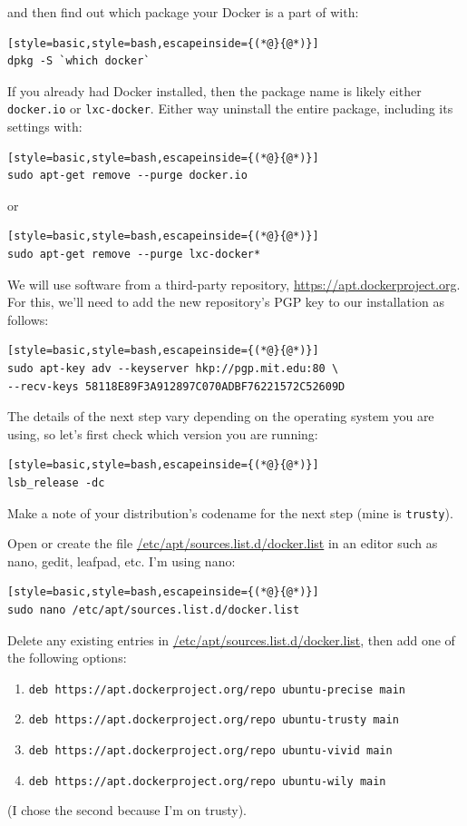 \documentclass[12pt, a4paper, twoside, openany, titlepage]{book}
\begin{document}
and then find out which package your Docker is a part of with:
\begin{lstlisting}[style=basic,style=bash,escapeinside={(*@}{@*)}]
dpkg -S `which docker`
\end{lstlisting}

If you already had Docker installed, then the package name is likely either \texttt{docker.io} or \texttt{lxc-docker}. Either way uninstall the entire package, including its settings with:
\begin{lstlisting}[style=basic,style=bash,escapeinside={(*@}{@*)}]
sudo apt-get remove --purge docker.io
\end{lstlisting}
or
\begin{lstlisting}[style=basic,style=bash,escapeinside={(*@}{@*)}]
sudo apt-get remove --purge lxc-docker*
\end{lstlisting}

We will use software from a third-party repository, \url{https://apt.dockerproject.org}. For this, we'll need to add the new repository's PGP key to our installation as follows:
\begin{lstlisting}[style=basic,style=bash,escapeinside={(*@}{@*)}]
sudo apt-key adv --keyserver hkp://pgp.mit.edu:80 \
--recv-keys 58118E89F3A912897C070ADBF76221572C52609D
\end{lstlisting}

The details of the next step vary depending on the operating system you are using, so let's first check which version you are running:
\begin{lstlisting}[style=basic,style=bash,escapeinside={(*@}{@*)}]
lsb_release -dc
\end{lstlisting}
Make a note of your distribution's codename for the next step (mine is \texttt{trusty}).

Open or create the file \url{/etc/apt/sources.list.d/docker.list} in an editor such as nano, gedit, leafpad, etc. I'm using nano:
\begin{lstlisting}[style=basic,style=bash,escapeinside={(*@}{@*)}]
sudo nano /etc/apt/sources.list.d/docker.list
\end{lstlisting}

Delete any existing entries in \url{/etc/apt/sources.list.d/docker.list}, then add one of the following options:
\begin{enumerate}
\item{\texttt{deb https://apt.dockerproject.org/repo ubuntu-precise main}}
\item{\texttt{deb https://apt.dockerproject.org/repo ubuntu-trusty main}}
\item{\texttt{deb https://apt.dockerproject.org/repo ubuntu-vivid main}}
\item{\texttt{deb https://apt.dockerproject.org/repo ubuntu-wily main}}
\end{enumerate}
(I chose the second because I'm on trusty).
\end{document}
